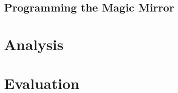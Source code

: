 \documentclass[conference]{IEEEtran}
\begin{document}
\subsection{Programming the Magic Mirror}

\section{Analysis} 

\section{Evaluation}


\end{document}
